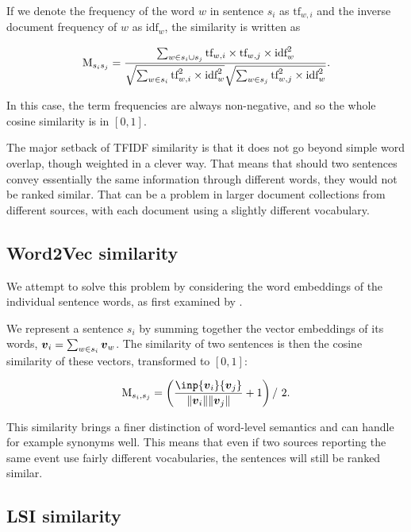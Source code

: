If we denote the frequency of the word $w$ in sentence $s_{i}$ as $\text{tf}_{w,i}$ and the inverse document frequency of $w$ as $\text{idf}_{w}$, the similarity is written as

\begin{equation}
	\text{M}_{s_{i}s_{j}} = \frac{\sum_{w \in s_{i} \cup s_{j}} \text{tf}_{w,i} \times \text{tf}_{w,j} \times \text{idf}_{w}^{2}}{\sqrt{\sum_{w \in s_{i}} \text{tf}_{w, i}^{2} \times \text{idf}_{w}^{2}} \sqrt{\sum_{w \in s_{j}} \text{tf}_{w, j}^{2} \times \text{idf}_{w}^{2}}}.
\end{equation}

In this case, the term frequencies are always non-negative, and so the whole cosine similarity is in $[0, 1]$.

The major setback of TFIDF similarity is that it does not go beyond simple word overlap, though weighted in a clever way. That means that should two sentences convey essentially the same information through different words, they would not be ranked similar. That can be a problem in larger document collections from different sources, with each document using a slightly different vocabulary.

\subsection{Word2Vec similarity}

We attempt to solve this problem by considering the word embeddings of the individual sentence words, as first examined by \cite{mogren-1}.

We represent a sentence $s_{i}$ by summing together the vector embeddings of its words, $\embed_{i} = \sum_{w \in s_{i}} \embed_{w}$. The similarity of two sentences is then the cosine similarity of these vectors, transformed to $[0, 1]$:

\begin{equation}
	\similarity_{s_{i}, s_{j}} = \left(\frac{\inp{\embed_{i}}{\embed_{j}}}{\| \embed_{i} \| \| \embed_{j} \|} + 1 \right) / \ 2.
\end{equation}

This similarity brings a finer distinction of word-level semantics and can handle for example synonyms well. This means that even if two sources reporting the same event use fairly different vocabularies, the sentences will still be ranked similar.

\subsection{LSI similarity}


